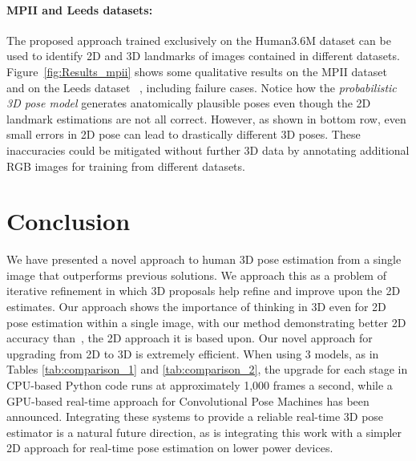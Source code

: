 \documentclass[10pt,twocolumn,letterpaper]{article}
\begin{document}

\paragraph{MPII and Leeds datasets:}
The  proposed approach trained exclusively on the Human3.6M dataset can
be used to identify 2D and 3D landmarks of images contained in
different datasets. Figure~\ref{fig:Results_mpii} shows some
qualitative results on the MPII
dataset~\cite{Andriluka:etal:CVPR:2014} and
on the Leeds dataset ~\cite{Johnson10}, including failure cases. Notice how the 
\textit{probabilistic 3D pose model} generates anatomically plausible
poses even though the 2D landmark estimations are not all
correct. However, as shown in bottom row, even small errors in 2D pose
can lead to drastically different 3D poses. These inaccuracies could
be mitigated without further 3D data by annotating additional RGB
images for training from different datasets.








\section{Conclusion}
We have presented a novel approach to human 3D pose estimation from a
single image that outperforms previous solutions. We approach this as
a problem of iterative refinement in which 3D proposals help refine
and improve upon the 2D estimates.
Our approach shows the importance of thinking in 3D even for 2D pose
estimation within a single image, with our method 
demonstrating better 2D accuracy than~\cite{wei2016convolutional}, the 2D approach it is
based upon. 
Our novel approach for upgrading from 2D to 3D is extremely efficient. When
using 3 models, as in Tables \ref{tab:comparison_1} and \ref{tab:comparison_2},
the upgrade for each stage in CPU-based Python code runs at approximately 1,000
frames a second, while a GPU-based real-time approach for Convolutional Pose
Machines has been announced. Integrating these systems to provide a reliable
real-time 3D pose estimator is a natural future direction, as is integrating
this work with a simpler 2D approach for real-time pose estimation on lower
power devices.
\end{document}
